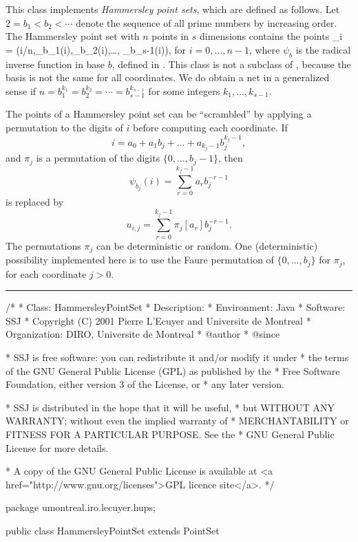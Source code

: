 
This class implements \emph{Hammersley point sets}, 
which are defined as follows.
Let $2 = b_1 < b_2 < \cdots$ denote the sequence of all prime 
numbers by increasing order.
The Hammersley point set with $n$ points in $s$ dimensions contains
the points
\eq
 _i = (i/n,\psi_{b_1}(i),\psi_{b_2}(i),\dots, \psi_{b_{s-1}}(i)),
\endeq
for $i=0,\dots,n-1$, where $\psi_b$ is the radical inverse function
in base $b$, defined in .
This class is not a subclass of , because the basis
is not the same for all coordinates.
We do obtain a net in a generalized sense if 
$n = b_1^{k_1} = b_2^{k_2} = \cdots = b_{s-1}^{k_{s-1}}$
for some integers $k_1,\dots,k_{s-1}$.

The points of a Hammersley point set can be ``scrambled'' by applying a 
permutation to the digits of $i$ before computing each coordinate.  If 
\[
  i = a_0 + a_1 b_j + \dots + a_{k_j-1} b_j^{k_j-1},
\]
and $\pi_j$ is a permutation of the digits $\{0,\dots,b_j-1\}$, then
\[
 \psi_{b_j}(i) = \sum_{r=0}^{k_j-1} a_r b_j^{-r-1} 
\]
is replaced  by
\[
 u_{i,j}= \sum_{r=0}^{k_j-1} \pi_j[a_r] b_j^{-r-1}.
\]
The permutations $\pi_j$ can be deterministic or random.
One (deterministic) possibility implemented here is to use
the Faure permutation of $\{0,\dots,b_j\}$ for $\pi_j$, for each 
coordinate $j > 0$.


\bigskip\hrule\bigskip

\begin{code}
\begin{hide}
/*
 * Class:        HammersleyPointSet
 * Description:  
 * Environment:  Java
 * Software:     SSJ 
 * Copyright (C) 2001  Pierre L'Ecuyer and Universite de Montreal
 * Organization: DIRO, Universite de Montreal
 * @author       
 * @since

 * SSJ is free software: you can redistribute it and/or modify it under
 * the terms of the GNU General Public License (GPL) as published by the
 * Free Software Foundation, either version 3 of the License, or
 * any later version.

 * SSJ is distributed in the hope that it will be useful,
 * but WITHOUT ANY WARRANTY; without even the implied warranty of
 * MERCHANTABILITY or FITNESS FOR A PARTICULAR PURPOSE.  See the
 * GNU General Public License for more details.

 * A copy of the GNU General Public License is available at
   <a href="http://www.gnu.org/licenses">GPL licence site</a>.
 */
\end{hide}
package umontreal.iro.lecuyer.hups;


public class HammersleyPointSet extends PointSet\begin{hide} {
   private int[] base;           // Vector of prime bases.
   private int[][] permutation;  // Digits permutation, for each dimension.
   private boolean permuted;     // Permute digits?
\end{hide}
\end{code}

